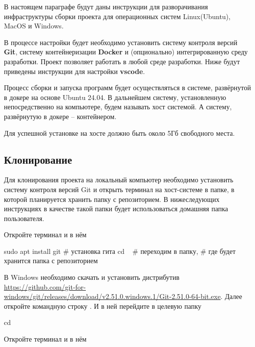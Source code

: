В настоящем параграфе будут даны инструкции для разворачивания инфраструктуры сборки проекта
для операционных систем Linux(Ubuntu), MacOS и Windows.

В процессе настройки будет необходимо установить систему контроля версий {\bf Git},
систему контейнеризации {\bf Docker} и (опционально) интегрированную среду разработки.
Проект позволяет работать в любой среде разработки.
Ниже будут приведены инструкции для настройки {\bf vscode}.

Процесс сборки и запуска программ будет осуществляться в системе, развёрнутой в докере на основе Ubuntu 24.04.
В дальнейшем систему, установленную непосредственно на компьютере, будем называть хост системой.
А систему, развёрнутую в докере -- контейнером.

Для успешной установке на хосте должно быть около 5Гб свободного места.

\subsection{Клонирование}
Для клонирования проекта на локальный компьютер необходимо установить систему контроля версий Git
и открыть терминал на хост-системе в папке, в которой планируется хранить папку с репозиторием.
В нижеследующих инструкциях в качестве такой папки будет использоваться домашняя папка пользователя.

\begin{center}

\begin{tcolorbox}[osstyle, title=Ubuntu]
Откройте терминал и в нём
\begin{shelloutput}
sudo apt install git  # установка гита
cd ~                  # переходим в папку,
                      # где будет хранится папка с репозиторием
\end{shelloutput}
\end{tcolorbox}

\begin{tcolorbox}[osstyle, title=Windows]
В Windows необходимо скачать и установить дистрибутив
\url{https://github.com/git-for-windows/git/releases/download/v2.51.0.windows.1/Git-2.51.0-64-bit.exe}.
Далее откройте командную строку . И в ней перейдите в целевую папку
\begin{shelloutput}
cd %
\end{shelloutput}
\end{tcolorbox}

\begin{tcolorbox}[osstyle, title=MacOs]
Откройте терминал и в нём
\end{tcolorbox}

\end{center}

